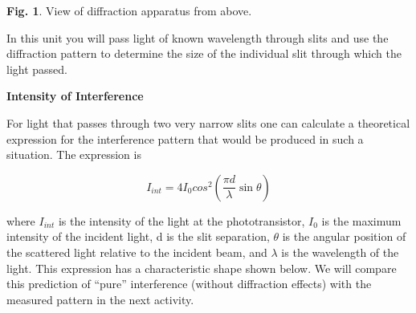 \vspace{0.1cm}
\begin{center}
{\centering {} \par}
\end{center}
\vspace{0.1cm}

{\centering \textbf{Fig. 1}. View of diffraction apparatus from above.\par}

In this unit you will  pass light of known wavelength through slits 
and use the diffraction pattern to determine the size of the individual
slit through which the light passed.

\newpage

\textbf{Intensity of Interference }

For light that passes through two very narrow slits one can calculate
a theoretical expression for the interference pattern that would be
produced in such a situation. The expression is 

\begin{equation} I_{int} = 4I_0 cos^2 \left (\frac {\pi d} {\lambda} \sin \theta \right ) \end{equation}

where $I_{int}$ is the intensity of the light at the phototransistor,
$I_{0}$ is the maximum intensity of the incident light, d is
the slit separation, \( \theta  \) is the angular position of the
scattered light relative to the incident beam, and \( \lambda  \)
is the wavelength of the light. This expression has a characteristic
shape shown below. We will compare this prediction of {}``pure''
interference (without diffraction effects) with the measured pattern
in the next activity.

